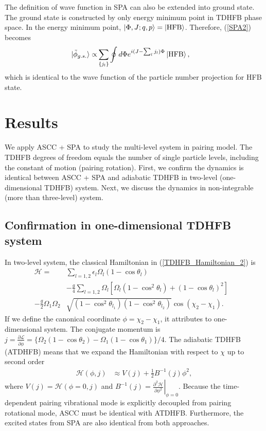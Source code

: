 \documentclass[%
superscriptaddress,
showpacs,
nofootinbib,
amsmath,amssymb,
aps,
prc,
twocolumn,
floatfix ]%
{revtex4-1}
\begin{document}
The definition of wave function in SPA can also be extended into ground state. The ground state is constructed by only energy minimum point in TDHFB phase space. In the energy minimum point, $\ket{\Phi,J;q,p}=\ket{\rm HFB}$. Therefore, (\ref{SPA2}) becomes
\begin{align}
 \ket{\tilde{\phi}_{g.s.}} \propto& \sum_{\{j_l\}} \oint d\Phi e^{i(J-\sum_l j_l)\Phi} \ket{\rm HFB},  
\end{align}
which is identical to the wave function of the particle number projection for HFB state.

\section{Results}
We apply ASCC + SPA to study the multi-level system in pairing model. The TDHFB degrees of freedom equals the number of single particle levels, including the constant of motion (pairing rotation). First, we confirm the dynamics is identical between ASCC + SPA and adiabatic TDHFB in two-level (one-dimensional TDHFB) system. Next, we discuss the dynamics in non-integrable (more than three-level) system.  


\subsection{Confirmation in one-dimensional TDHFB system}
In two-level system, the classical Hamiltonian in (\ref{TDHFB_Hamiltonian_2}) is
\begin{align}
\mathcal{H} 
  =& \sum_{l=1,2} \epsilon_l\Omega_l(1- \cos{\theta}_l)& \nonumber \\ 
 &- \frac{g}{4}\sum_{l=1,2} \Omega_l [\Omega_l(1-\cos^2{\theta}_l)+(1-\cos{\theta}_l)^2] \nonumber \\
- \frac{g}{2} \Omega_{1}\Omega_{2}&\sqrt{(1-\cos^2{\theta}_{l_1})(1-\cos^2{\theta}_{l_2})}\cos{(\chi_{2}-\chi_{1})}   .
\end{align}
If we define the canonical coordinate $\phi=\chi_2-\chi_1$, it attributes to one-dimensional system. The conjugate momentum is $j= \frac{\partial\mathcal{L}}{\partial\dot{\phi}} = \{\Omega_2(1-\cos{\theta}_2) - \Omega_1(1-\cos{\theta}_1)\}/4$. The adiabatic TDHFB (ATDHFB) means that we expand the Hamiltonian with respect to $\chi$ up to second order
\begin{align}
  \mathcal{H}(\phi,j) &\approx V(j) + \frac{1}{2}B^{-1}(j)\phi^2,
\end{align}
where $V(j)=\mathcal{H}(\phi=0,j)$ and $B^{-1}(j)= \left. \frac{\partial^2\mathcal{H}}{\partial\phi^2} \right|_{\phi=0}$.
Because the time-dependent pairing vibrational mode is explicitly decoupled from pairing rotational mode, ASCC must be identical with ATDHFB. Furthermore, the excited states from SPA are also identical from both approaches.
\end{document}

